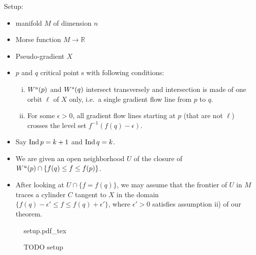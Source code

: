 \documentclass[a4paper]{article}
\newcommand{\incfig}[1]{%
    \def\svgwidth{\columnwidth}
    {#1.pdf_tex}
}
\newcommand\R{\mathbb R}
\begin{document}
    Setup:
    \begin{itemize}
        \item manifold $M$ of dimension $n$
        \item Morse function $M \to  \R$
        \item Pseudo-gradient $X$
        \item  $p$ and $q$ critical point s with following conditions:
            \begin{enumerate}[i)]
                \item $W^u(p)$ and $W^s(q)$ intersect transversely and intersection is made of one orbit  $\ell$ of $X$ only, i.e.\ a single gradient flow line from  $p$ to  $q$. 
                \item For some $\epsilon > 0$, all  gradient flow lines starting at $p$ (that are not  $\ell$) crosses the level set $f^{-1}(f(q) - \epsilon)$.
            \end{enumerate}
    \end{itemize}

    \begin{itemize}
        \item Say $\operatorname{Ind} p = k + 1$ and  $\operatorname{Ind} q = k$.
        \item We are given an open neighborhood  $U$ of the closure of  $W^u(p) \cap  \{f(q) \le  f \le f(p)\} $.
        \item After looking at $U \cap \{f  = f(q)\} $, we may assume that the frontier of $U$ in  $M$ traces a cylinder  $C$ tangent to  $X$ in the domain  $ \{f(q) - \epsilon' \le  f \le  f(q) + \epsilon'\} $, where $\epsilon' > 0$ satisfies assumption ii) of our theorem.
    \end{itemize}


\begin{figure}[H]
    \centering
    \incfig{setup}
    \caption{TODO setup}
    \label{fig:setup}
\end{figure}
\end{document}
